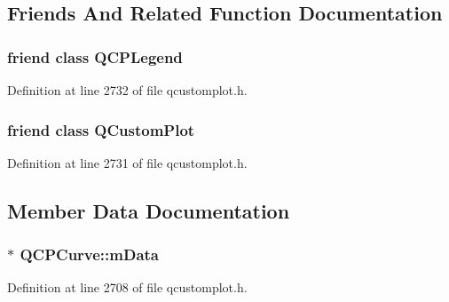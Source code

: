 \subsection{Friends And Related Function Documentation}
\hypertarget{class_q_c_p_curve_a8429035e7adfbd7f05805a6530ad5e3b}{}
\subsubsection[{Q\+C\+P\+Legend}]{\setlength{\rightskip}{0pt plus 5cm}friend class {\bf Q\+C\+P\+Legend}\hspace{0.3cm}{\ttfamily [friend]}}\label{class_q_c_p_curve_a8429035e7adfbd7f05805a6530ad5e3b}


Definition at line 2732 of file qcustomplot.\+h.

\hypertarget{class_q_c_p_curve_a1cdf9df76adcfae45261690aa0ca2198}{}
\subsubsection[{Q\+Custom\+Plot}]{\setlength{\rightskip}{0pt plus 5cm}friend class {\bf Q\+Custom\+Plot}\hspace{0.3cm}{\ttfamily [friend]}}\label{class_q_c_p_curve_a1cdf9df76adcfae45261690aa0ca2198}


Definition at line 2731 of file qcustomplot.\+h.



\subsection{Member Data Documentation}
\hypertarget{class_q_c_p_curve_a88d533e455bca96004b049e99168731b}{}
\subsubsection[{m\+Data}]{$\ast$ Q\+C\+P\+Curve\+::m\+Data\hspace{0.3cm}{\ttfamily [protected]}}\label{class_q_c_p_curve_a88d533e455bca96004b049e99168731b}


Definition at line 2708 of file qcustomplot.\+h.



